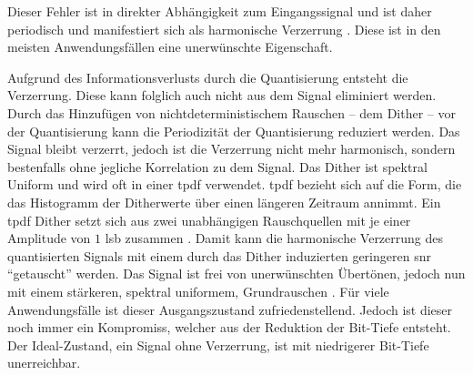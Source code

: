 Dieser Fehler ist in direkter Abhängigkeit zum Eingangssignal und ist daher periodisch und manifestiert sich als harmonische Verzerrung \autocites{dither}{noise-shaping}.
Diese ist in den meisten Anwendungsfällen eine unerwünschte Eigenschaft.

Aufgrund des Informationsverlusts durch die Quantisierung entsteht die Verzerrung.
Diese kann folglich auch nicht aus dem Signal eliminiert werden.
Durch das Hinzufügen von nichtdeterministischem Rauschen -- dem Dither -- vor der Quantisierung kann die Periodizität der Quantisierung reduziert werden.
Das Signal bleibt verzerrt, jedoch ist die Verzerrung nicht mehr harmonisch, sondern bestenfalls ohne jegliche Korrelation zu dem Signal.
Das Dither ist spektral Uniform und wird oft in einer \gls{tpdf} verwendet.
\gls{tpdf} bezieht sich auf die Form, die das Histogramm der Ditherwerte über einen längeren Zeitraum annimmt.
Ein \gls{tpdf} Dither setzt sich aus zwei unabhängigen Rauschquellen mit je einer Amplitude von $1$ \gls{lsb} zusammen \autocites{dither}[S. 23ff, S. 30ff, Figure 2-10b]{dsp-guide}.
Damit kann die harmonische Verzerrung des quantisierten Signals mit einem durch das Dither induzierten geringeren \gls{snr} \enquote{getauscht} werden.
Das Signal ist frei von unerwünschten Übertönen, jedoch nun mit einem stärkeren, spektral uniformem, Grundrauschen \autocites{dither}{noise-shaping}.
Für viele Anwendungsfälle ist dieser Ausgangszustand zufriedenstellend.
Jedoch ist dieser noch immer ein Kompromiss, welcher aus der Reduktion der Bit-Tiefe entsteht.
Der Ideal-Zustand, ein Signal ohne Verzerrung, ist mit niedrigerer Bit-Tiefe unerreichbar.

